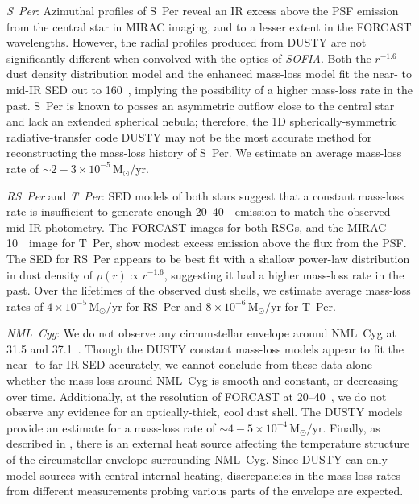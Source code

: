 \documentclass[modern]{aastex61}
\newcommand{\SOFIA}{{\it SOFIA}}
\begin{document}
\textit{S~Per}: Azimuthal profiles of S~Per reveal an IR excess above the PSF emission from the central star in MIRAC imaging, and to a lesser extent in the FORCAST wavelengths. However, the radial profiles produced from DUSTY are not significantly different when convolved with the optics of \SOFIA.  Both the $r^{-1.6}$ dust density distribution model and the enhanced mass-loss model fit the near- to mid-IR SED out to 160~\micron, implying the possibility of a higher mass-loss rate in the past.  S~Per is known to posses an asymmetric outflow close to the central star and lack an extended spherical nebula; therefore, the 1D spherically-symmetric radiative-transfer code DUSTY may not be the most accurate method for reconstructing the mass-loss history of S~Per. We estimate an average mass-loss rate of $\sim2-3\times10^{-5}\,\mathrm{M}_\odot$/yr.

\textit{RS~Per} and \textit{T~Per}: SED models of both stars suggest that a constant mass-loss rate is insufficient to generate enough 20--40~\micron\ emission to match the observed mid-IR photometry.  The FORCAST images for both RSGs, and the MIRAC 10~\micron\ image for T~Per, show modest excess emission above the flux from the PSF.  The SED for RS~Per appears to be best fit with a shallow power-law distribution in dust density of $\rho\left(r\right)\propto r^{-1.6}$, suggesting it had a higher mass-loss rate in the past. Over the lifetimes of the observed dust shells, we estimate average mass-loss rates of $4\times10^{-5}\,\mathrm{M}_\odot/$yr for RS~Per and $8\times10^{-6}\,\mathrm{M}_\odot/$yr for T~Per.

\textit{NML~Cyg}: We do not observe any circumstellar envelope around NML~Cyg at 31.5 and 37.1~\micron.  Though the DUSTY constant mass-loss models appear to fit the near- to far-IR SED accurately, we cannot conclude from these data alone whether the mass loss around NML~Cyg is smooth and constant, or decreasing over time.  Additionally, at the resolution of FORCAST at 20--40~\micron, we do not observe any evidence for an optically-thick, cool dust shell. The DUSTY models provide an estimate for a mass-loss rate of $\sim4-5\times10^{-4}\,\mathrm{M}_\odot/$yr.  Finally, as described in \cite{schuster2006,schuster2009}, there is an external heat source affecting the temperature structure of the circumstellar envelope surrounding NML~Cyg.  Since DUSTY can only model sources with central internal heating, discrepancies in the mass-loss rates from different measurements probing various parts of the envelope are expected.
\end{document}
